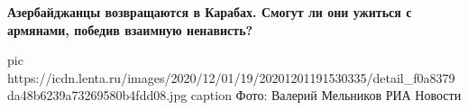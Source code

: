  
 
 
 
 

\begin{leftbar}
	\bfseries
Азербайджанцы возвращаются в Карабах. Смогут ли они ужиться с армянами, победив
взаимную ненависть?
\end{leftbar}

\ifcmt
pic https://icdn.lenta.ru/images/2020/12/01/19/20201201191530335/detail_f0a8379da48b6239a73269580b4fdd08.jpg
caption Фото: Валерий Мельников РИА Новости
\fi



